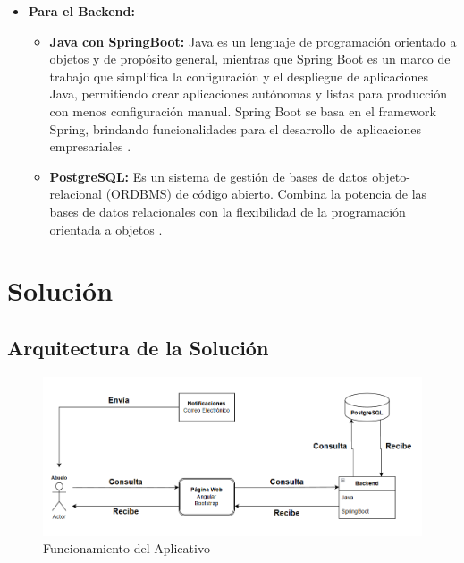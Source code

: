 \documentclass[stu, 12pt, letterpaper, donotrepeattitle, floatsintext, natbib]{apa7}
\begin{document}
\begin{itemize}
\begin{itemize}
	\end{itemize}
	
	\item \textbf{Para el Backend:}
	
	\begin{itemize}
		\item \textbf{Java con SpringBoot:} 
		Java es un lenguaje de programación orientado a objetos y de propósito general, mientras que Spring Boot es un marco de trabajo que simplifica la configuración y el despliegue de aplicaciones Java, permitiendo crear aplicaciones autónomas y listas para producción con menos configuración manual. Spring Boot se basa en el framework Spring, brindando funcionalidades para el desarrollo de aplicaciones empresariales \cite{ibmSpringBoot}.
		
		\item \textbf{PostgreSQL:} 
		Es un sistema de gestión de bases de datos objeto-relacional (ORDBMS) de código abierto. Combina la potencia de las bases de datos relacionales con la flexibilidad de la programación orientada a objetos \cite{datacampPostgreSQL}.	
	\end{itemize}
	
\end{itemize}

\section{Solución}

\subsection{Arquitectura de la Solución}

\begin{figure}[H]
	\caption[]{Funcionamiento del Aplicativo}
	\label{Funcionamiento del Aplicativo}
	\includegraphics[width=1\linewidth]{Prototipo/../Diagramas/Diagrama Solucion.png}
\end{figure}
\end{document}
